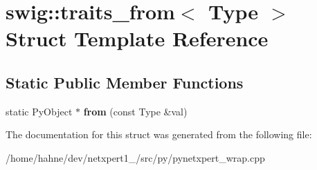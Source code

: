 \hypertarget{structswig_1_1traits__from}{}\section{swig\+:\+:traits\+\_\+from$<$ Type $>$ Struct Template Reference}
\label{structswig_1_1traits__from}
\subsection*{Static Public Member Functions}
\begin{DoxyCompactItemize}
\item 
static Py\+Object $\ast$ {\bfseries from} (const Type \&val)\hypertarget{structswig_1_1traits__from_a502976b6bea889bcc35d0aed72e8d901}{}\label{structswig_1_1traits__from_a502976b6bea889bcc35d0aed72e8d901}

\end{DoxyCompactItemize}


The documentation for this struct was generated from the following file\+:\begin{DoxyCompactItemize}
\item 
/home/hahne/dev/netxpert1\+\_/src/py/pynetxpert\+\_\+wrap.\+cpp\end{DoxyCompactItemize}
